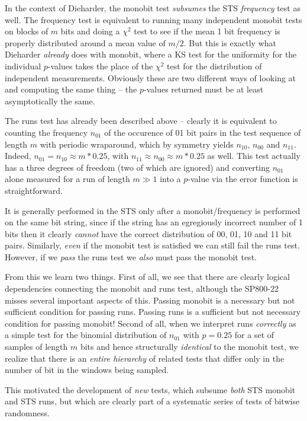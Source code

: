 \documentclass[12pt]{article}
\begin{document}
In the context of Dieharder, the monobit test {\em subsumes} the STS
{\em frequency} test as well.  The frequency test is equivalent to
running many independent monobit tests on blocks of $m$ bits and doing a
$\chi^2$ test to see if the mean 1 bit frequency is properly distributed
around a mean value of $m/2$.  But this is exactly what Dieharder {\em
already} does with monobit, where a KS test for the uniformity for the
individual $p$-values takes the place of the $\chi^2$ test for the
distribution of independent measurements.  Obviously these are two
different ways of looking at and computing the same thing -- the
$p$-values returned must be at least asymptotically the same.

The runs test has already been described above -- clearly it is
equivalent to counting the frequency $n_{01}$ of the occurence of 01 bit
pairs in the test sequence of length $m$ with periodic wraparound, which
by symmetry yields $n_{10}$, $n_{00}$ and $n_{11}$.  Indeed, $n_{01} =
n_{10} \approx m*0.25$, with $n_{11} \approx n_{00} \approx m*0.25$ as
well.  This test actually has a three degrees of freedom (two of which
are ignored) and converting $n_{01}$ alone measured for a run of length
$m \gg 1$ into a $p$-value via the error function is straightforward.

It is generally performed in the STS only after a monobit/frequency is
performed on the same bit string, since if the string has an egregiously
incorrect number of 1 bits then it clearly {\em cannot} have the correct
distribution of 00, 01, 10 and 11 bit pairs.  Similarly, {\em even} if
the monobit test is satisfied we can still fail the runs test.  However,
if we {\em pass} the runs test we {\em also} must pass the monobit test.

From this we learn two things.  First of all, we see that there are
clearly logical dependencies connecting the monobit and runs test,
although the SP800-22 misses several important aspects of this.  Passing
monobit is a necessary but not sufficient condition for passing runs.
Passing runs is a sufficient but not necessary condition for passing
monobit!  Second of all, when we interpret runs {\em correctly} as a
simple test for the binomial distribution of $n_{01}$ with $p = 0.25$
for a set of samples of length $m$ bits and hence structurally {\em
identical} to the monobit test, we realize that there is an {\em entire
hierarchy} of related tests that differ only in the number of bit in the
windows being sampled.

This motivated the development of {\em new} tests, which subsume {\em
both} STS monobit and STS runs, but which are clearly part of a
systematic series of tests of bitwise randomness.
\end{document}
